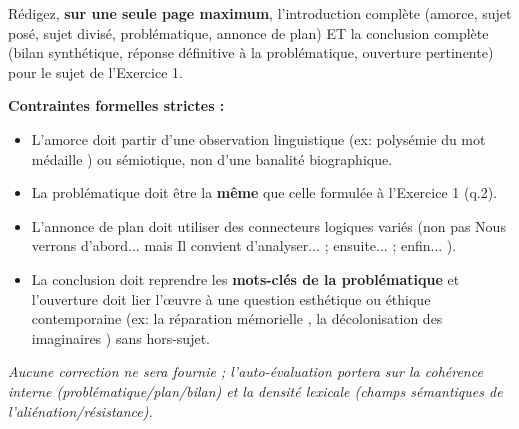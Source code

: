 \documentclass[11pt]{article}
\begin{document}
\begin{exercice}
Rédigez, \textbf{sur une seule page maximum}, l'introduction complète (amorce, sujet posé, sujet divisé, problématique, annonce de plan) ET la conclusion complète (bilan synthétique, réponse définitive à la problématique, ouverture pertinente) pour le sujet de l'Exercice 1.

\textbf{Contraintes formelles strictes :}
\begin{itemize}
    \item L'amorce doit partir d'une observation linguistique (ex: polysémie du mot \og médaille \fg) ou sémiotique, non d'une banalité biographique.
    \item La problématique doit être la \textbf{même} que celle formulée à l'Exercice 1 (q.2).
    \item L'annonce de plan doit utiliser des connecteurs logiques variés (non pas \og Nous verrons d'abord... \fg mais \og Il convient d'analyser... ; ensuite... ; enfin... \fg).
    \item La conclusion doit reprendre les \textbf{mots-clés de la problématique} et l'ouverture doit lier l'œuvre à une question esthétique ou éthique contemporaine (ex: \og la réparation mémorielle \fg, \og la décolonisation des imaginaires \fg) sans hors-sujet.
\end{itemize}
\emph{Aucune correction ne sera fournie ; l'auto-évaluation portera sur la cohérence interne (problématique/plan/bilan) et la densité lexicale (champs sémantiques de l'aliénation/résistance).}
\end{exercice}
\end{document}
